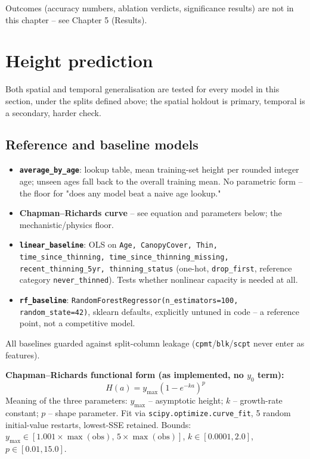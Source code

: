 Outcomes (accuracy numbers, ablation verdicts, significance results) are not in this chapter --
see Chapter 5 (Results).

\section{Height prediction}

Both spatial and temporal generalisation are tested for every model in this section, under the
splits defined above; the spatial holdout is primary, temporal is a secondary, harder check.

\subsection*{Reference and baseline models}

\begin{itemize}
\setlength\itemsep{0pt}
\item \textbf{\texttt{average\_by\_age}}: lookup table, mean training-set height per rounded
integer age; unseen ages fall back to the overall training mean. No parametric form -- the floor
for "does any model beat a naive age lookup."
\item \textbf{Chapman--Richards curve} -- see equation and parameters below; the mechanistic/physics
floor.
\item \textbf{\texttt{linear\_baseline}}: OLS on \texttt{Age, CanopyCover, Thin,
time\_since\_thinning, time\_since\_thinning\_missing, recent\_thinning\_5yr, thinning\_status}
(one-hot, \texttt{drop\_first}, reference category \texttt{never\_thinned}). Tests whether
nonlinear capacity is needed at all.
\item \textbf{\texttt{rf\_baseline}}: \texttt{RandomForestRegressor(n\_estimators=100,
random\_state=42)}, sklearn defaults, explicitly untuned in code -- a reference point, not a
competitive model.
\end{itemize}

All baselines guarded against split-column leakage (\texttt{cpmt}/\texttt{blk}/\texttt{scpt}
never enter as features).

\textbf{Chapman--Richards functional form (as implemented, no $y_0$ term):}
\[
H(a) = y_{\max}\left(1 - e^{-ka}\right)^p
\]
Meaning of the three parameters: $y_{\max}$ -- asymptotic height; $k$ -- growth-rate constant;
$p$ -- shape parameter. Fit via \texttt{scipy.optimize.curve\_fit}, 5 random initial-value
restarts, lowest-SSE retained. Bounds: $y_{\max}\in[1.001\times\max(\text{obs}),\,5\times\max(\text{obs})]$,
$k\in[0.0001, 2.0]$, $p\in[0.01, 15.0]$.

